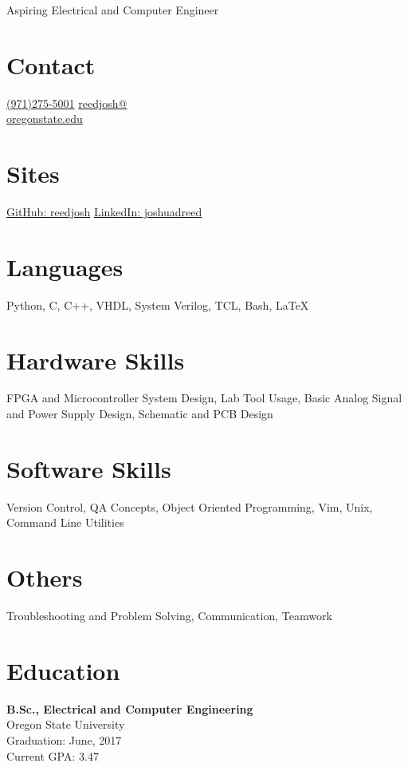 \documentclass[]{friggeri-cv}
\begin{document}
       {Aspiring Electrical and Computer Engineer}


\begin{aside}
  \section{Contact}
    \href{tel:19712755001}{(971)275-5001}
    \href{mailto:reedjosh@oregonstate.edu}{reedjosh@\\oregonstate.edu}
  \section{Sites}
    \href{https://github.com/reedjosh}{GitHub: reedjosh}
    \href{https://www.linkedin.com/in/joshuadreed}{LinkedIn: joshuadreed}
  \section{Languages}
    Python, C, C++, VHDL, System Verilog, TCL, Bash, \LaTeX
  \section{Hardware Skills}
    FPGA and Microcontroller System Design,  Lab Tool Usage,  Basic Analog Signal and Power Supply Design, Schematic and PCB Design
  \section{Software Skills}
    Version Control, QA Concepts,
    Object Oriented Programming, Vim, Unix, Command Line Utilities
  \section{Others} Troubleshooting and Problem Solving, Communication, Teamwork
\end{aside}



\section{Education}

    \textbf{B.Sc., Electrical and Computer Engineering} \\
    Oregon State University \\
    Graduation: June, 2017 \\
    Current GPA: 3.47
\end{document}
